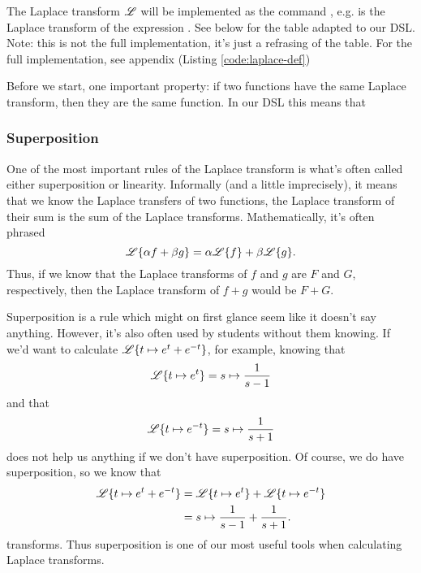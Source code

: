 The Laplace
transform $\mathscr{L}$ will be implemented as the command , e.g.
 is the Laplace transform of the expression .
See  below for the table adapted to our DSL. Note: this is not the
full implementation, it's just a refrasing of the table. For the full
implementation, see appendix (Listing
\ref{code:laplace-def})

Before we
start, one important property: if two
functions have the same Laplace transform, then they are the same function. In
our DSL this means that 

\subsubsection{Superposition}
One of the most important rules of the Laplace transform is what's often called
either superposition or linearity. Informally (and a little imprecisely), it means that we know the
Laplace transfers of two functions, the Laplace transform of their sum is the
sum of the Laplace transforms. Mathematically, it's often phrased
\begin{equation*}
 \mathscr{L} \{\alpha f + \beta g\} = \alpha \mathscr{L} \{f\} + \beta \mathscr{L} \{g\}.
\end{equation*}
Thus, if we know that the Laplace transforms of $f$ and $g$ are $F$ and $G$,
respectively, then the Laplace transform of $f + g$ would be $F + G$.

Superposition is a rule which might on first glance seem like it doesn't say
anything. However, it's also often used by students without them knowing.
If we'd want to calculate $\mathscr{L}\{t \mapsto e^{t} + e^{-t}\}$, for example,
knowing that 
\begin{equation*}
  \mathscr{L}\{t \mapsto e^{t}\}  = s \mapsto \frac{1}{s-1}
  \end{equation*}
and that 
  \begin{equation*}
  \mathscr{L}\{t \mapsto e^{-t}\} = s \mapsto \frac{1}{s+1}
\end{equation*}
does not help us anything if we don't have superposition.
Of course, we do have superposition, so we know that
\begin{align*}
  \mathscr{L}\{t \mapsto e^{t}+e^{-t}\} &= \mathscr{L}\{ t \mapsto e^t \} + \mathscr{L}\{t \mapsto e^{-t}\} \\
                                &= s \mapsto \frac{1}{s-1}   + \frac{1}{s+1}.
\end{align*}
transforms. 
Thus superposition is one of our most useful tools when calculating Laplace
transforms. 

